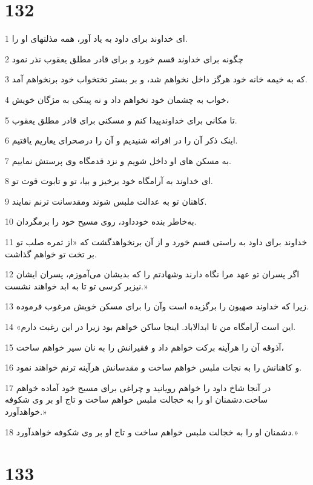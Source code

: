 \chapter{132}

\par 1 ای خداوند برای داود به یاد آور، همه مذلتهای او را.
\par 2 چگونه برای خداوند قسم خورد و برای قادر مطلق یعقوب نذر نمود
\par 3 که به خیمه خانه خود هرگز داخل نخواهم شد، و بر بستر تختخواب خود برنخواهم آمد.
\par 4 خواب به چشمان خود نخواهم داد و نه پینکی به مژگان خویش،
\par 5 تا مکانی برای خداوندپیدا کنم و مسکنی برای قادر مطلق یعقوب.
\par 6 اینک ذکر آن را در افراته شنیدیم و آن را درصحرای یعاریم یافتیم.
\par 7 به مسکن های او داخل شویم و نزد قدمگاه وی پرستش نماییم.
\par 8 ‌ای خداوند به آرامگاه خود برخیز و بیا، تو و تابوت قوت تو.
\par 9 کاهنان تو به عدالت ملبس شوند ومقدسانت ترنم نمایند.
\par 10 به‌خاطر بنده خودداود، روی مسیح خود را برمگردان.
\par 11 خداوند برای داود به راستی قسم خورد و از آن برنخواهدگشت که «از ثمره صلب تو بر تخت تو خواهم گذاشت.
\par 12 اگر پسران تو عهد مرا نگاه دارند وشهادتم را که بدیشان می‌آموزم، پسران ایشان نیزبر کرسی تو تا به ابد خواهند نشست.»
\par 13 زیرا که خداوند صهیون را برگزیده است وآن را برای مسکن خویش مرغوب فرموده.
\par 14 «این است آرامگاه من تا ابدالاباد. اینجا ساکن خواهم بود زیرا در این رغبت دارم.
\par 15 آذوقه آن را هرآینه برکت خواهم داد و فقیرانش را به نان سیر خواهم ساخت،
\par 16 و کاهنانش را به نجات ملبس خواهم ساخت و مقدسانش هرآینه ترنم خواهند نمود.
\par 17 در آنجا شاخ داود را خواهم رویانید و چراغی برای مسیح خود آماده خواهم ساخت.دشمنان او را به خجالت ملبس خواهم ساخت و تاج او بر وی شکوفه خواهدآورد.»
\par 18 دشمنان او را به خجالت ملبس خواهم ساخت و تاج او بر وی شکوفه خواهدآورد.»
 
\chapter{133}

